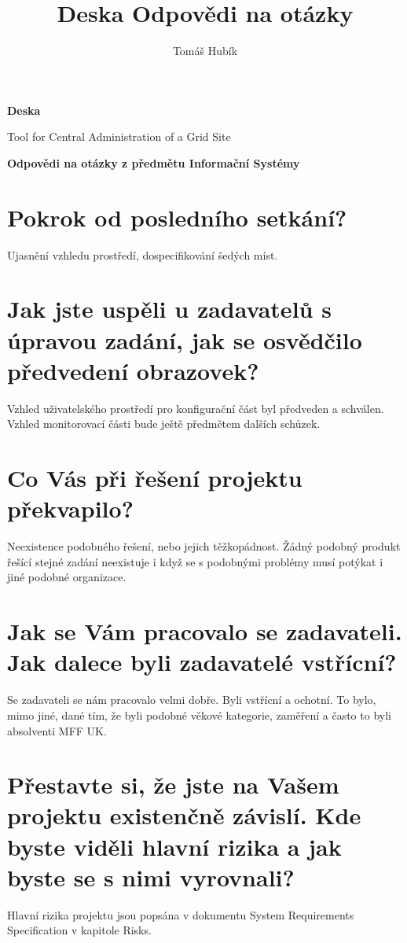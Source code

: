\documentclass[12pt]{article}
\author{Tomáš Hubík}
\title{Deska Odpovědi na otázky}
\begin{document}
{\Huge \textbf{Deska}}

\vspace{0.2in}

{\large Tool for Central Administration of a Grid Site}

\vspace{0.5in}

{\Large \textbf{Odpovědi na otázky z předmětu Informační Systémy}}

\vspace{0.5in}


\section{Pokrok od posledního setkání?}
Ujasnění vzhledu prostředí, dospecifikování šedých míst.

\section{Jak jste uspěli u zadavatelů s úpravou zadání, jak se osvědčilo
předvedení obrazovek?}
Vzhled uživatelského prostředí pro konfigurační část byl předveden a schválen.
Vzhled monitorovací části bude ještě předmětem dalších schůzek.

\section{Co Vás při řešení projektu překvapilo?}
Neexistence podobného řešení, nebo jejich těžkopádnost. Žádný podobný produkt
řešící stejné zadání neexistuje i když se s podobnými problémy musí potýkat i
jiné podobné organizace.

\section{Jak se Vám pracovalo se zadavateli. Jak dalece byli zadavatelé
vstřícní?}
Se zadavateli se nám pracovalo velmi dobře. Byli vstřícní a ochotní. To bylo,
mimo jiné, dané tím, že byli podobné věkové kategorie, zaměření a často to byli
absolventi MFF UK. 

\section{ Přestavte si, že jste na Vašem projektu existenčně závislí. Kde byste
viděli hlavní rizika a jak byste se s nimi vyrovnali?}
Hlavní rizika projektu jsou popsána v dokumentu System Requirements Specification
v kapitole Risks.
\end{document}
